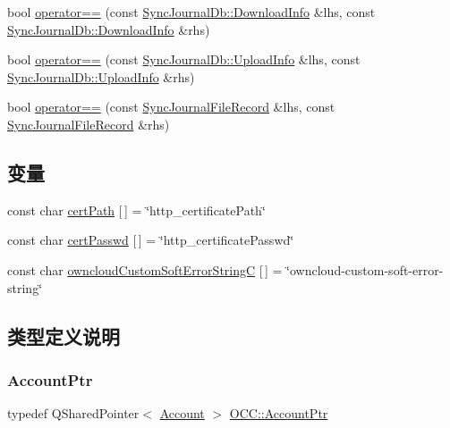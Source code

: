 \begin{DoxyCompactItemize}
\item 
bool \hyperlink{namespace_o_c_c_adaf2ff16c9c33507fc4cafd261283a47}{operator==} (const \hyperlink{struct_o_c_c_1_1_sync_journal_db_1_1_download_info}{Sync\+Journal\+Db\+::\+Download\+Info} \&lhs, const \hyperlink{struct_o_c_c_1_1_sync_journal_db_1_1_download_info}{Sync\+Journal\+Db\+::\+Download\+Info} \&rhs)
\item 
bool \hyperlink{namespace_o_c_c_a294d9a31b5733f4eff3b432a389e894e}{operator==} (const \hyperlink{struct_o_c_c_1_1_sync_journal_db_1_1_upload_info}{Sync\+Journal\+Db\+::\+Upload\+Info} \&lhs, const \hyperlink{struct_o_c_c_1_1_sync_journal_db_1_1_upload_info}{Sync\+Journal\+Db\+::\+Upload\+Info} \&rhs)
\item 
bool \hyperlink{namespace_o_c_c_a8490465b9d53659e960b7701d8c84e52}{operator==} (const \hyperlink{class_o_c_c_1_1_sync_journal_file_record}{Sync\+Journal\+File\+Record} \&lhs, const \hyperlink{class_o_c_c_1_1_sync_journal_file_record}{Sync\+Journal\+File\+Record} \&rhs)
\end{DoxyCompactItemize}
\subsection*{变量}
\begin{DoxyCompactItemize}
\item 
const char \hyperlink{namespace_o_c_c_a04729ffc872e281833cebe2466f2ed85}{cert\+Path} \mbox{[}$\,$\mbox{]} = \char`\"{}http\+\_\+certificate\+Path\char`\"{}
\item 
const char \hyperlink{namespace_o_c_c_a3073897f93271e18b6cf6cfdc14f6182}{cert\+Passwd} \mbox{[}$\,$\mbox{]} = \char`\"{}http\+\_\+certificate\+Passwd\char`\"{}
\item 
const char \hyperlink{namespace_o_c_c_a06454c945d2ad9885d1e6a21ea344892}{owncloud\+Custom\+Soft\+Error\+StringC} \mbox{[}$\,$\mbox{]} = \char`\"{}owncloud-\/custom-\/soft-\/error-\/string\char`\"{}
\end{DoxyCompactItemize}


\subsection{类型定义说明}
\mbox{\label{namespace_o_c_c_a848616aedb9188e223c6b9867757fe69}} 
\subsubsection{\texorpdfstring{Account\+Ptr}{AccountPtr}}
{\footnotesize\ttfamily typedef Q\+Shared\+Pointer$<$ \hyperlink{class_o_c_c_1_1_account}{Account} $>$ \hyperlink{namespace_o_c_c_a848616aedb9188e223c6b9867757fe69}{O\+C\+C\+::\+Account\+Ptr}}



